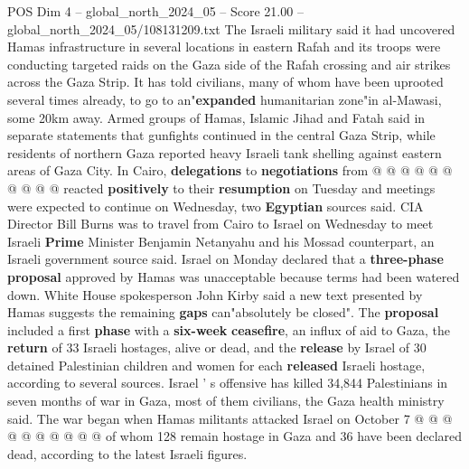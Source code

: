 \begin{textsample}{POS Dim 4 – global\_north\_2024\_05 – Score 21.00 – global\_north\_2024\_05/108131209.txt}
The Israeli military said it had uncovered Hamas infrastructure in several locations in eastern Rafah and its troops were conducting targeted raids on the Gaza side of the Rafah crossing and air strikes across the Gaza Strip.
It has told civilians, many of whom have been uprooted several times already, to go to an"\textbf{expanded} humanitarian zone"in al-Mawasi, some 20km away.
Armed groups of Hamas, Islamic Jihad and Fatah said in separate statements that gunfights continued in the central Gaza Strip, while residents of northern Gaza reported heavy Israeli tank shelling against eastern areas of Gaza City.
In Cairo, \textbf{delegations} to \textbf{negotiations} from @ @ @ @ @ @ @ @ @ @ reacted \textbf{positively} to their \textbf{resumption} on Tuesday and meetings were expected to continue on Wednesday, two \textbf{Egyptian} sources said.
CIA Director Bill Burns was to travel from Cairo to Israel on Wednesday to meet Israeli \textbf{Prime} Minister Benjamin Netanyahu and his Mossad counterpart, an Israeli government source said.
Israel on Monday declared that a \textbf{three-phase} \textbf{proposal} approved by Hamas was unacceptable because terms had been watered down.
White House spokesperson John Kirby said a new text presented by Hamas suggests the remaining \textbf{gaps} can"absolutely be closed".
The \textbf{proposal} included a first \textbf{phase} with a \textbf{six-week} \textbf{ceasefire}, an influx of aid to Gaza, the \textbf{return} of 33 Israeli hostages, alive or dead, and the \textbf{release} by Israel of 30 detained Palestinian children and women for each \textbf{released} Israeli hostage, according to several sources.
Israel ' s offensive has killed 34,844 Palestinians in seven months of war in Gaza, most of them civilians, the Gaza health ministry said.
The war began when Hamas militants attacked Israel on October 7 @ @ @ @ @ @ @ @ @ @ of whom 128 remain hostage in Gaza and 36 have been declared dead, according to the latest Israeli figures.

\end{textsample}
